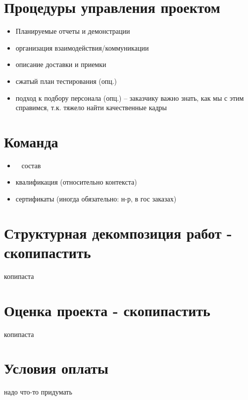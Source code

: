 \documentclass[a4paper,8pt]{article}
\begin{document}
\section{Процедуры управления проектом}

\begin{itemize}
  \item Планируемые отчеты и демонстрации
  \item организация взаимодействия/коммуникации
  \item описание доставки и приемки
  \item сжатый план тестирования (опц.)
  \item подход к подбору персонала (опц.) -- заказчику важно знать, как мы с этим справимся, т.к. тяжело найти качественные кадры
\end{itemize}

\section{Команда}
\begin{itemize}
  \item ~ состав
  \item квалификация (относительно контекста)
  \item сертификаты (иногда обязательно: н-р, в гос заказах)
\end{itemize}

\section{Структурная декомпозиция работ - скопипастить}
копипаста

\section{Оценка проекта - скопипастить}
копипаста

\section{Условия оплаты}
надо что-то придумать

\end{document}
